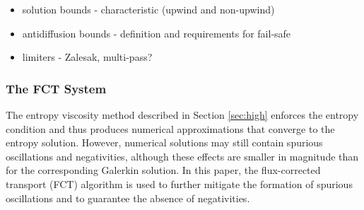 
\begin{itemize}
  \item solution bounds - characteristic (upwind and non-upwind)
  \item antidiffusion bounds - definition and requirements for fail-safe
  \item limiters - Zalesak, multi-pass?
\end{itemize}

\subsubsection{The FCT System}

The entropy viscosity method described in Section \ref{sec:high} enforces
the entropy condition and thus produces numerical approximations that
converge to the entropy solution. However, numerical solutions may still
contain spurious oscillations and negativities, although these effects are
smaller in magnitude than for the corresponding Galerkin solution.
In this paper, the flux-corrected transport (FCT) algorithm
is used to further mitigate the formation of spurious oscillations and
to guarantee the absence of negativities.

